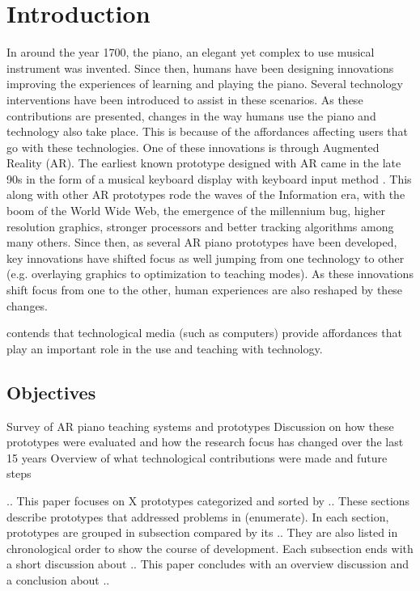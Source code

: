 \documentclass[manuscript,screen]{acmart}
\begin{document}
\section{Introduction}
In around the year 1700, the piano, an elegant yet complex to use musical instrument was invented. Since then, humans have been designing innovations improving the experiences of learning and playing the piano. Several technology interventions have been introduced to assist in these scenarios. As these contributions are presented, changes in the way humans use the piano and technology also take place. This is because of the affordances affecting users that go with these technologies. One of these innovations is through Augmented Reality (AR). The earliest known prototype designed with AR came in the late 90s in the form of a musical keyboard display with keyboard input method \cite{breitweiser1996musical}. This along with other AR prototypes rode the waves of the Information era, with the boom of the World Wide Web, the emergence of the millennium bug, higher resolution graphics, stronger processors and better tracking algorithms among many others. Since then, as several AR piano prototypes have been developed, key innovations have shifted focus as well jumping from one technology to other (e.g. overlaying graphics to optimization to teaching modes). As these innovations shift focus from one to the other, human experiences are also reshaped by these changes. 

\citet{dede1996evolution} contends that technological media (such as computers) provide affordances that play an important role in the use and teaching with technology. 


\subsection{Objectives}

Survey of AR piano teaching systems and prototypes
Discussion on how these prototypes were evaluated and how the research focus has changed over the last 15 years
Overview of what technological contributions were made and future steps 

.. This paper focuses on X prototypes categorized and sorted by .. These sections describe prototypes that addressed problems in (enumerate). In each section, prototypes are grouped in subsection compared by its .. They are also listed in chronological order to show the course of development. Each subsection ends with a short discussion about .. This paper concludes with an overview discussion and a conclusion about ..
\end{document}
